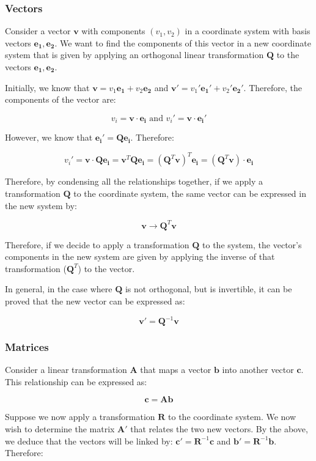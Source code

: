 \documentclass[12pt]{article}
\begin{document}
\subsubsection{Vectors}

Consider a vector $\mathbf{v}$ with components $(v_1, v_2)$ in a coordinate system with basis vectors $\mathbf{e_1, e_2}$. We want to find the components of this vector in a new coordinate system that is given by applying an orthogonal linear transformation $\mathbf{Q}$ to the vectors $\mathbf{e_1, e_2}$. 

Initially, we know that $\mathbf{v} = v_1\mathbf{e_1} + v_2\mathbf{e_2}$ and $\mathbf{v'} = v_1'\mathbf{e_1'} + v_2'\mathbf{e_2'}$. Therefore, the components of the vector are:

\[ v_i = \mathbf{v \cdot e_i} \text{   and   } v_i' = \mathbf{v \cdot e_i'} \]

However, we know that $\mathbf{e_i'} = \mathbf{Qe_i}$. Therefore:

\[ v_i' = \mathbf{v \cdot Qe_i} = \mathbf{v}^T\mathbf{Qe_i} = (\mathbf{Q}^T\mathbf{v})^T\mathbf{e_i} = (\mathbf{Q}^T\mathbf{v}) \cdot \mathbf{e_i} \]

Therefore, by condensing all the relationships together, if we apply a transformation $\mathbf{Q}$ to the coordinate system, the same vector can be expressed in the new system by:

\[ \mathbf{v} \to \mathbf{Q}^T\mathbf{v} \]

Therefore, if we decide to apply a transformation $\mathbf{Q}$ to the system, the vector's components in the new system are given by applying the inverse of that transformation ($\mathbf{Q}^T$) to the vector.

In general, in the case where $\mathbf{Q}$ is not orthogonal, but is invertible, it can be proved that the new vector can be expressed as:

\[ \mathbf{v'} = \mathbf{Q}^{-1}\mathbf{v} \]

\subsubsection{Matrices}

Consider a linear transformation $\mathbf{A}$ that maps a vector $\mathbf{b}$ into another vector $\mathbf{c}$. This relationship can be expressed as:

\[ \mathbf{c} = \mathbf{Ab} \]

Suppose we now apply a transformation $\mathbf{R}$ to the coordinate system. We now wish to determine the matrix $\mathbf{A}'$ that relates the two new vectors. By the above, we deduce that the vectors will be linked by: $\mathbf{c}' = \mathbf{R}^{-1}\mathbf{c}$ and $\mathbf{b}' = \mathbf{R}^{-1}\mathbf{b}$. Therefore:
\end{document}
